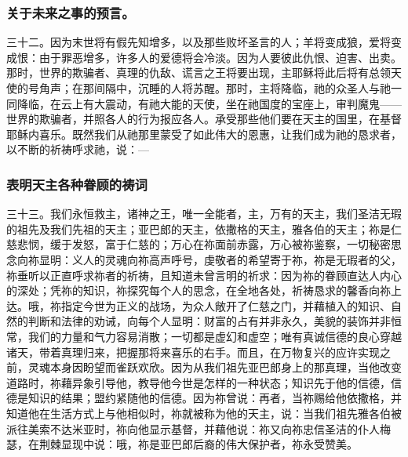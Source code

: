 
\subsubsection{关于未来之事的预言。}

三十二。因为末世将有假先知增多，以及那些败坏圣言的人；羊将变成狼，爱将变成恨：由于罪恶增多，许多人的爱德将会冷淡。因为人要彼此仇恨、迫害、出卖。那时，世界的欺骗者、真理的仇敌、谎言之王将要出现，主耶稣将此后将有总领天使的号角声；在那间隔中，沉睡的人将苏醒。那时，主将降临，祂的众圣人与祂一同降临，在云上有大震动，有祂大能的天使，坐在祂国度的宝座上，审判魔鬼——世界的欺骗者，并照各人的行为报应各人。承受那些他们要在天主的国里，在基督耶稣内喜乐。既然我们从祂那里蒙受了如此伟大的恩惠，让我们成为祂的恳求者，以不断的祈祷呼求祂，说：---\par


\subsubsection{表明天主各种眷顾的祷词}

三十三。我们永恒救主，诸神之王，唯一全能者，主，万有的天主，我们圣洁无瑕的祖先及我们先祖的天主；亚巴郎的天主，依撒格的天主，雅各伯的天主；祢是仁慈悲悯，缓于发怒，富于仁慈的；万心在祢面前赤露，万心被祢鉴察，一切秘密思念向祢显明：义人的灵魂向祢高声呼号，虔敬者的希望寄于祢，祢是无瑕者的父，祢垂听以正直呼求祢者的祈祷，且知道未曾言明的祈求：因为祢的眷顾直达人内心的深处；凭祢的知识，祢探究每个人的思念，在全地各处，祈祷恳求的馨香向祢上达。哦，祢指定今世为正义的战场，为众人敞开了仁慈之门，并藉植入的知识、自然的判断和法律的劝诫，向每个人显明：财富的占有并非永久，美貌的装饰并非恒常，我们的力量和气力容易消散；一切都是虚幻和虚空；唯有真诚信德的良心穿越诸天，带着真理归来，把握那将来喜乐的右手。而且，在万物复兴的应许实现之前，灵魂本身因盼望而雀跃欢欣。因为从我们祖先亚巴郎身上的那真理，当他改变道路时，祢藉异象引导他，教导他今世是怎样的一种状态；知识先于他的信德，信德是知识的结果；盟约紧随他的信德。因为祢曾说：再者，当祢赐给他依撒格，并知道他在生活方式上与他相似时，祢就被称为他的天主，说：当我们祖先雅各伯被派往美索不达米亚时，祢向他显示基督，并藉他说：祢又向祢忠信圣洁的仆人梅瑟，在荆棘显现中说：哦，祢是亚巴郎后裔的伟大保护者，祢永受赞美。\par

